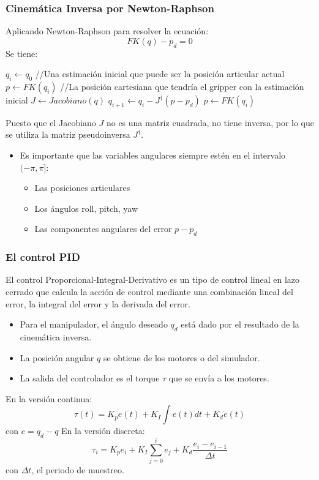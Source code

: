 \begin{frame}\frametitle{Cinemática Inversa por Newton-Raphson}
  Aplicando Newton-Raphson para resolver la ecuación:
  \[FK(q) - p_d = 0\]
  Se tiene:
  \begin{algorithm}[H]
    \DontPrintSemicolon
    $q_i \leftarrow q_0$ //Una estimación inicial que puede ser la posición articular actual\;
    $p \leftarrow FK(q_i)$ //La posición cartesiana que tendría el gripper con la estimación inicial\;
    {
      $J \leftarrow Jacobiano(q)$     \;
      $q_{i+1} \leftarrow q_i - J^\dagger (p - p_d)$\;
      $p \leftarrow FK(q_i)$ 
    }
  \end{algorithm}
  Puesto que el Jacobiano $J$ no es una matriz cuadrada, no tiene inversa, por lo que se utiliza la matriz pseudoinversa $J^\dagger$. 
  \begin{itemize}
  \item Es importante que las variables angulares siempre estén en el intervalo $(-\pi, \pi]$:
    \begin{itemize}
    \item Las posiciones articulares
    \item Los ángulos roll, pitch, yaw
    \item Las componentes angulares del error $p - p_d$
    \end{itemize}
  \end{itemize}
\end{frame}

\begin{frame}\frametitle{El control PID}
  El control Proporcional-Integral-Derivativo es un tipo de control lineal en lazo cerrado que calcula la acción de control mediante una combinación lineal del error, la integral del error y la derivada del error.
  \begin{itemize}
  \item Para el manipulador, el ángulo deseado $q_d$ está dado por el resultado de la cinemática inversa. 
  \item La posición angular $q$ se obtiene de los motores o del simulador.
  \item La salida del controlador es el torque $\tau$ que se envía a los motores.
  \end{itemize}
  En la versión continua:
  \[\tau(t) = K_p e(t) + K_I \int e(t)dt + K_d \dot{e}(t)\]
  con $e = q_d - q$
  En la versión discreta:
  \[\tau_i = K_p e_i + K_I\sum_{j=0}^i e_j + K_d\frac{e_i - e_{i-1}}{\Delta t}\]
  con $\Delta t$, el periodo de muestreo. 
\end{frame}

